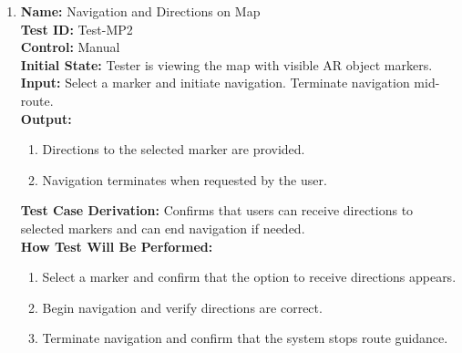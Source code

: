 \documentclass[12pt, titlepage]{article}
\begin{document}
\begin{enumerate}
  \item \textbf{Name:} Navigation and Directions on Map \label{itm:Test-MP2} \\
        \textbf{Test ID:} Test-MP2 \\
        \textbf{Control:} Manual \\
        \textbf{Initial State:} Tester is viewing the map with visible AR object markers. \\
        \textbf{Input:} Select a marker and initiate navigation. Terminate navigation mid-route. \\
        \textbf{Output:}
        \begin{enumerate}
          \item Directions to the selected marker are provided.
          \item Navigation terminates when requested by the user.
        \end{enumerate}
        \textbf{Test Case Derivation:} Confirms that users can receive directions to selected markers and can end navigation if needed. \\
        \textbf{How Test Will Be Performed:}
        \begin{enumerate}
          \item Select a marker and confirm that the option to receive directions appears.
          \item Begin navigation and verify directions are correct.
          \item Terminate navigation and confirm that the system stops route guidance.
        \end{enumerate}


\end{enumerate}
\end{document}
